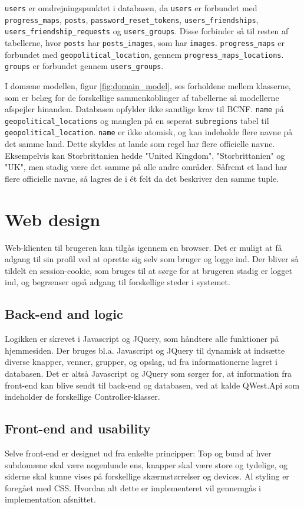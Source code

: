 \texttt{users} er omdrejningspunktet i databasen, da \texttt{users} er forbundet med \texttt{progress\_maps}, \texttt{posts}, \texttt{password\_reset\_tokens}, \texttt{users\_friendships}, \texttt{users\_friendship\_requests} og \texttt{users\_groups}. Disse forbinder så til resten af tabellerne, hvor \texttt{posts} har \texttt{posts\_images}, som har \texttt{images}. \texttt{progress\_maps} er forbundet med \texttt{geopolitical\_location}, gennem \texttt{progress\_maps\_locations}. \texttt{groups} er forbundet gennem \texttt{users\_groups}.

I domæne modellen, figur \ref{fig:domain_model}, ses forholdene mellem klasserne, som er belæg for de forskellige sammenkoblinger af tabellerne så modellerne afspejler hinanden. Databasen opfylder ikke samtlige krav til BCNF\cite{bcnf}. \texttt{name} på \texttt{geopolitical\_locations} og manglen på en seperat \texttt{subregions} tabel til \texttt{geopolitical\_location}. \texttt{name} er ikke atomisk, og kan indeholde flere navne på det samme land. Dette skyldes at lande som regel har flere officielle navne. Eksempelvis kan Storbrittanien hedde "United Kingdom", "Storbrittanien" og "UK", men stadig være det samme på alle andre områder. Såfremt et land har flere officielle navne, så lagres de i ét felt da det beskriver den samme tuple.

\section{Web design}\label{sec:webdesignACR}
Web-klienten til brugeren kan tilgås igennem en browser. Det er muligt at få adgang til sin profil ved at oprette sig selv som bruger og logge ind. Der bliver så tildelt en session-cookie, som bruges til at sørge for at brugeren stadig er logget ind, og begrænser også adgang til forskellige steder i systemet.
\subsection{Back-end and logic}\label{sec:backendACR}
Logikken er skrevet i Javascript og JQuery, som håndtere alle funktioner på hjemmesiden. Der bruges bl.a. Javascript og JQuery til dynamisk at indsætte diverse knapper, venner, grupper, og opslag, ud fra informationerne lagret i databasen. Det er altså Javascript og JQuery som sørger for, at information fra front-end kan blive sendt til back-end og databasen, ved at kalde QWest.Api som indeholder de forskellige Controller-klasser.
\subsection{Front-end and usability}\label{sec:frontendACR}
Selve front-end er designet ud fra enkelte principper: Top og bund af hver subdomæne skal være nogenlunde ens, knapper skal være store og tydelige, og siderne skal kunne vises på forskellige skærmstørrelser og devices. Al styling er foregået med CSS. Hvordan alt dette er implementeret vil gennemgås i implementation afsnittet.
